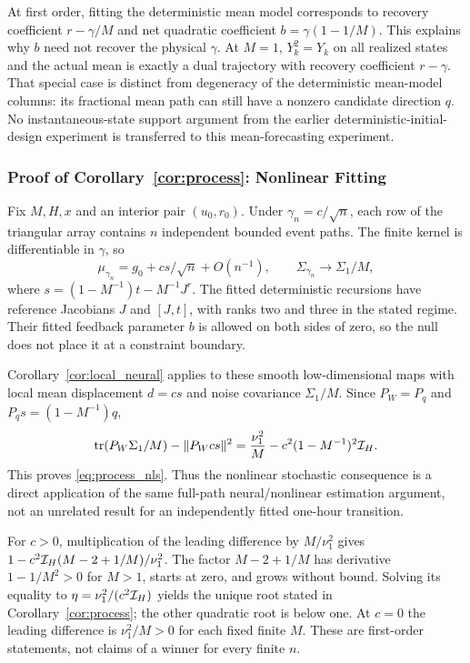 At first order, fitting the deterministic mean model corresponds to recovery coefficient $r-\gamma/M$ and net quadratic coefficient $b=\gamma(1-1/M)$. This explains why $b$ need not recover the physical $\gamma$. At $M=1$, $Y_k^2=Y_k$ on all realized states and the actual mean is exactly a dual trajectory with recovery coefficient $r-\gamma$. That special case is distinct from degeneracy of the deterministic mean-model columns: its fractional mean path can still have a nonzero candidate direction $q$. No instantaneous-state support argument from the earlier deterministic-initial-design experiment is transferred to this mean-forecasting experiment.

\subsubsection{Proof of Corollary~\ref{cor:process}: Nonlinear Fitting}
Fix $M,H,x$ and an interior pair $(u_0,r_0)$. Under $\gamma_n=c/\sqrt n$, each row of the triangular array contains $n$ independent bounded event paths. The finite kernel is differentiable in $\gamma$, so
\[
 \mu_{\gamma_n}=g_0+cs/\sqrt n+O(n^{-1}),\qquad
 \Sigma_{\gamma_n}\longrightarrow\Sigma_1/M,
\]
where $s=(1-M^{-1})t-M^{-1}J^r$. The fitted deterministic recursions have reference Jacobians $J$ and $[J,t]$, with ranks two and three in the stated regime. Their fitted feedback parameter $b$ is allowed on both sides of zero, so the null does not place it at a constraint boundary.

Corollary~\ref{cor:local_neural} applies to these smooth low-dimensional maps with local mean displacement $d=cs$ and noise covariance $\Sigma_1/M$. Since $P_W=P_q$ and $P_qs=(1-M^{-1})q$,
\[
 \operatorname{tr}(P_W\Sigma_1/M)-\|P_Wcs\|^2
 =\frac{\nu_1^2}{M}-c^2(1-M^{-1})^2\mathcal I_H.
\]
This proves \eqref{eq:process_nls}. Thus the nonlinear stochastic consequence is a direct application of the same full-path neural/nonlinear estimation argument, not an unrelated result for an independently fitted one-hour transition.

For $c>0$, multiplication of the leading difference by $M/\nu_1^2$ gives $1-c^2\mathcal I_H(M-2+1/M)/\nu_1^2$. The factor $M-2+1/M$ has derivative $1-1/M^2>0$ for $M>1$, starts at zero, and grows without bound. Solving its equality to $\eta=\nu_1^2/(c^2\mathcal I_H)$ yields the unique root stated in Corollary~\ref{cor:process}; the other quadratic root is below one. At $c=0$ the leading difference is $\nu_1^2/M>0$ for each fixed finite $M$. These are first-order statements, not claims of a winner for every finite $n$.

